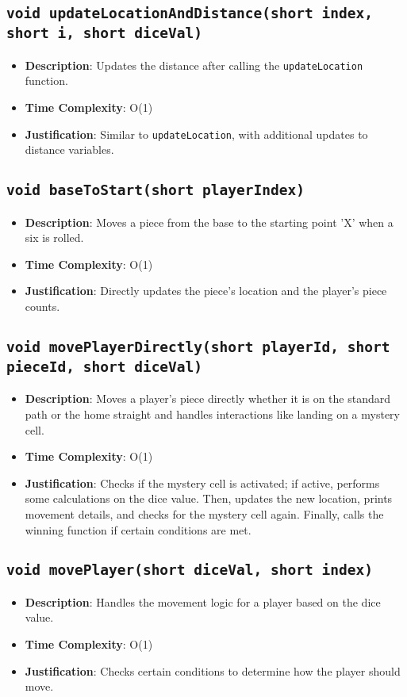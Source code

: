 \documentclass{article}
\begin{document}
\subsection{\texttt{void updateLocationAndDistance(short index, short i, short diceVal)}}
\begin{itemize}
    \item \textbf{Description}: Updates the distance after calling the \texttt{updateLocation} function.
    \item \textbf{Time Complexity}: O(1)
    \item \textbf{Justification}: Similar to \texttt{updateLocation}, with additional updates to distance variables.
\end{itemize}

\subsection{\texttt{void baseToStart(short playerIndex)}}
\begin{itemize}
    \item \textbf{Description}: Moves a piece from the base to the starting point 'X' when a six is rolled.
    \item \textbf{Time Complexity}: O(1)
    \item \textbf{Justification}: Directly updates the piece’s location and the player’s piece counts.
\end{itemize}

\subsection{\texttt{void movePlayerDirectly(short playerId, short pieceId, short diceVal)}}
\begin{itemize}
    \item \textbf{Description}: Moves a player's piece directly whether it is on the standard path or the home straight and handles interactions like landing on a mystery cell.
    \item \textbf{Time Complexity}: O(1)
    \item \textbf{Justification}: Checks if the mystery cell is activated; if active, performs some calculations on the dice value. Then, updates the new location, prints movement details, and checks for the mystery cell again. Finally, calls the winning function if certain conditions are met.
\end{itemize}

\subsection{\texttt{void movePlayer(short diceVal, short index)}}
\begin{itemize}
    \item \textbf{Description}: Handles the movement logic for a player based on the dice value.
    \item \textbf{Time Complexity}: O(1)
    \item \textbf{Justification}: Checks certain conditions to determine how the player should move.
\end{itemize}
\end{document}
